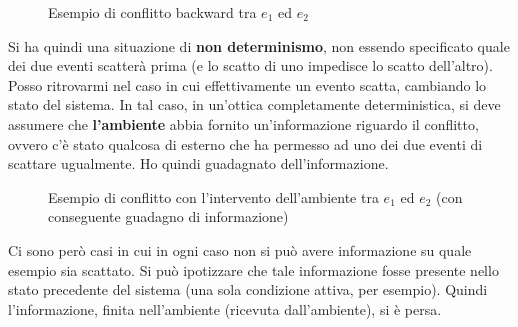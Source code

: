 \documentclass[a4paper,12pt, oneside]{book}
\begin{document}
\begin{definizione}
\begin{enumerate}
\begin{figure}[H]
      \caption{Esempio di conflitto backward tra $e_1$ ed $e_2$}
    \end{figure}
  \end{enumerate}
  Si ha quindi una situazione di \textbf{non determinismo}, non essendo
  specificato quale dei due eventi scatterà prima (e lo scatto di uno impedisce
  lo scatto dell'altro).
  Posso ritrovarmi nel caso in cui effettivamente un evento scatta, cambiando lo
  stato del sistema. In tal caso, in un'ottica completamente deterministica, si
  deve assumere che \textbf{l'ambiente} abbia fornito un'informazione
  riguardo il conflitto, ovvero c'è stato qualcosa di esterno che ha permesso ad
  uno dei due eventi di scattare ugualmente. Ho quindi guadagnato
  dell'informazione. 
  \begin{figure}[H]
    \centering
    \caption{Esempio di conflitto con l'intervento dell'ambiente tra $e_1$ ed
      $e_2$ (con conseguente guadagno di informazione)} 
  \end{figure}
  Ci sono però casi in cui in ogni caso non si può avere informazione su quale
  esempio sia scattato. Si può ipotizzare che tale informazione fosse presente
  nello stato precedente del sistema (una sola condizione attiva, per
  esempio). Quindi l'informazione, finita nell'ambiente (ricevuta
  dall'ambiente), si è persa.
  \begin{figure}[H]
    \centering
\end{figure}
\end{definizione}
\end{document}
